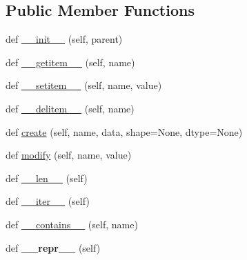\subsection*{Public Member Functions}
\begin{DoxyCompactItemize}
\item 
def \hyperlink{classh5py__LOCAL_1_1__hl_1_1attrs_1_1AttributeManager_ad4ae8a329ba0186e379690b54fb6d000}{\+\_\+\+\_\+init\+\_\+\+\_\+} (self, parent)
\item 
def \hyperlink{classh5py__LOCAL_1_1__hl_1_1attrs_1_1AttributeManager_a5c97a9eaefc7b107f1c7be2d7b8bb3df}{\+\_\+\+\_\+getitem\+\_\+\+\_\+} (self, name)
\item 
def \hyperlink{classh5py__LOCAL_1_1__hl_1_1attrs_1_1AttributeManager_a6f548cf0a4306cc8ebd88bc666473c36}{\+\_\+\+\_\+setitem\+\_\+\+\_\+} (self, name, value)
\item 
def \hyperlink{classh5py__LOCAL_1_1__hl_1_1attrs_1_1AttributeManager_a21ab06c8260ed6bd8b71dc061d4bd8d0}{\+\_\+\+\_\+delitem\+\_\+\+\_\+} (self, name)
\item 
def \hyperlink{classh5py__LOCAL_1_1__hl_1_1attrs_1_1AttributeManager_a485b851bb62a163f16f0c29113d11312}{create} (self, name, data, shape=None, dtype=None)
\item 
def \hyperlink{classh5py__LOCAL_1_1__hl_1_1attrs_1_1AttributeManager_a3dfa17073e54977bb867c1f3359065a9}{modify} (self, name, value)
\item 
def \hyperlink{classh5py__LOCAL_1_1__hl_1_1attrs_1_1AttributeManager_a637d2372d4e47d64b31235db263b8e37}{\+\_\+\+\_\+len\+\_\+\+\_\+} (self)
\item 
def \hyperlink{classh5py__LOCAL_1_1__hl_1_1attrs_1_1AttributeManager_a09d9dc48a04bb8da3a5c839d84fa8e9e}{\+\_\+\+\_\+iter\+\_\+\+\_\+} (self)
\item 
def \hyperlink{classh5py__LOCAL_1_1__hl_1_1attrs_1_1AttributeManager_a9b58ceebd97f80f015e13c1e53db6646}{\+\_\+\+\_\+contains\+\_\+\+\_\+} (self, name)
\item 
\mbox{\label{classh5py__LOCAL_1_1__hl_1_1attrs_1_1AttributeManager_ac18b3ca9131bb55cbb2eda173765e76e}} 
def {\bfseries \+\_\+\+\_\+repr\+\_\+\+\_\+} (self)
\end{DoxyCompactItemize}


